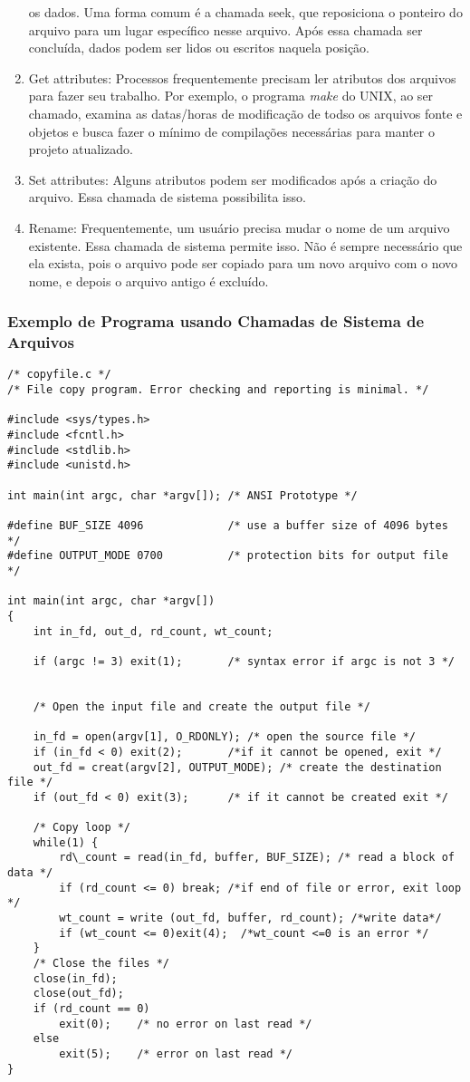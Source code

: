 \documentclass[10pt]{article}
\begin{document}
\begin{enumerate}
    os dados. Uma forma comum é a chamada seek, que reposiciona o ponteiro do arquivo para um lugar específico
    nesse arquivo. Após essa chamada ser concluída, dados podem ser lidos ou escritos naquela posição.
    \item Get attributes: Processos frequentemente precisam ler atributos dos arquivos para fazer seu trabalho.
    Por exemplo, o programa \textit{make} do UNIX, ao ser chamado, examina as datas/horas de modificação de todso
    os arquivos fonte e objetos e busca fazer o mínimo de compilações necessárias para manter o projeto atualizado.
    \item Set attributes: Alguns atributos podem ser modificados após a criação do arquivo. Essa chamada de sistema
    possibilita isso.
    \item Rename: Frequentemente, um usuário precisa mudar o nome de um arquivo existente. Essa chamada de sistema 
    permite isso. Não é sempre necessário que ela exista, pois o arquivo pode ser copiado para um novo arquivo com
    o novo nome, e depois o arquivo antigo é excluído.
\end{enumerate}

\subsubsection{Exemplo de Programa usando Chamadas de Sistema de Arquivos}
\begin{lstlisting}
/* copyfile.c */
/* File copy program. Error checking and reporting is minimal. */

#include <sys/types.h>
#include <fcntl.h>
#include <stdlib.h>
#include <unistd.h>

int main(int argc, char *argv[]); /* ANSI Prototype */

#define BUF_SIZE 4096             /* use a buffer size of 4096 bytes */
#define OUTPUT_MODE 0700          /* protection bits for output file */

int main(int argc, char *argv[])
{
    int in_fd, out_d, rd_count, wt_count;

    if (argc != 3) exit(1);       /* syntax error if argc is not 3 */


    /* Open the input file and create the output file */

    in_fd = open(argv[1], O_RDONLY); /* open the source file */
    if (in_fd < 0) exit(2);       /*if it cannot be opened, exit */
    out_fd = creat(argv[2], OUTPUT_MODE); /* create the destination file */
    if (out_fd < 0) exit(3);      /* if it cannot be created exit */

    /* Copy loop */
    while(1) {
        rd\_count = read(in_fd, buffer, BUF_SIZE); /* read a block of data */
        if (rd_count <= 0) break; /*if end of file or error, exit loop */
        wt_count = write (out_fd, buffer, rd_count); /*write data*/
        if (wt_count <= 0)exit(4);  /*wt_count <=0 is an error */
    }
    /* Close the files */
    close(in_fd);
    close(out_fd);
    if (rd_count == 0)
        exit(0);    /* no error on last read */
    else
        exit(5);    /* error on last read */
}
\end{lstlisting}
 
\end{document}
